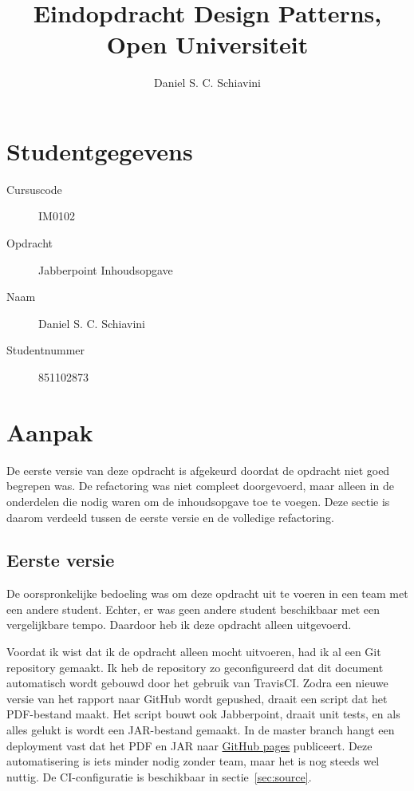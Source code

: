 \documentclass[a4paper]{article}
\title{Eindopdracht Design Patterns, Open Universiteit}
\author{Daniel S. C. Schiavini}
\begin{document}
\pagestyle{fancy}

\maketitle
{
	\renewcommand{\contentsname}{Inhoudsopgave}
	\setcounter{tocdepth}{2}
	\hypersetup{linkcolor=black}
	\tableofcontents
	\pagebreak
}

\section*{Studentgegevens}
    \begin{description}
        \item [Cursuscode] IM0102
        \item [Opdracht] Jabberpoint Inhoudsopgave
        \item [Naam] Daniel S. C. Schiavini
        \item [Studentnummer] 851102873
    \end{description}

\section*{Aanpak}
    \label{sec:aanpak}
	De eerste versie van deze opdracht is afgekeurd doordat de opdracht niet goed begrepen was.
	De refactoring was niet compleet doorgevoerd, maar alleen in de onderdelen die nodig waren om de inhoudsopgave toe te voegen.
	Deze sectie is daarom verdeeld tussen de eerste versie en de volledige refactoring.

	\subsection*{Eerste versie}
    De oorspronkelijke bedoeling was om deze opdracht uit te voeren in een team met een andere student.
    Echter, er was geen andere student beschikbaar met een vergelijkbare tempo.
    Daardoor heb ik deze opdracht alleen uitgevoerd.

    Voordat ik wist dat ik de opdracht alleen mocht uitvoeren, had ik al een Git repository gemaakt.
    Ik heb de repository zo geconfigureerd dat dit document automatisch wordt gebouwd door het gebruik van TravisCI.
    Zodra een nieuwe versie van het rapport naar GitHub wordt gepushed, draait een script dat het PDF-bestand maakt.
    Het script bouwt ook Jabberpoint, draait unit tests, en als alles gelukt is wordt een JAR-bestand gemaakt.
    In de master branch hangt een deployment vast dat het PDF en JAR naar \href{https://github.com/DanielSchiavini/design-patterns-assignment/tree/gh-pages}{GitHub pages} publiceert.
    Deze automatisering is iets minder nodig zonder team, maar het is nog steeds wel nuttig.
    De CI-configuratie is beschikbaar in sectie~\ref{sec:source}.
\end{document}
